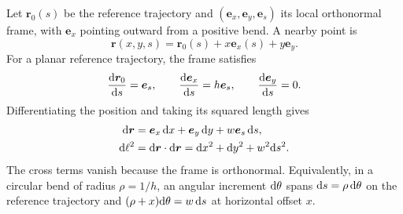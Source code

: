 Let \(\bm r_0(s)\) be the reference trajectory and
\((\bm e_x,\bm e_y,\bm e_s)\) its local orthonormal frame, with
\(\bm e_x\) pointing outward from a positive bend. A nearby point is
\begin{equation}
 \bm r(x,y,s)=\bm r_0(s)+x\bm e_x(s)+y\bm e_y.
\end{equation}
For a planar reference trajectory, the frame satisfies
\begin{equation}
 \frac{\text{d}\bm r_0}{\text{d} s}=\bm e_s,\qquad
 \frac{\text{d}\bm e_x}{\text{d} s}=h\bm e_s,\qquad
 \frac{\text{d}\bm e_y}{\text{d} s}=0.
\end{equation}
Differentiating the position and taking its squared length gives
\begin{align}
 \text{d}\bm r&=\bm e_x\,\text{d} x+\bm e_y\,\text{d} y+w\bm e_s\,\text{d} s,\\
 \text{d}\ell^2&=\text{d}\bm r\cdot\text{d}\bm r
             =\text{d} x^2+\text{d} y^2+w^2\text{d} s^2.
 \label{bfe:line-element}
\end{align}
The cross terms vanish because the frame is orthonormal. Equivalently,
in a circular bend of radius \(\rho=1/h\), an angular increment
\(\text{d}\theta\) spans \(\text{d} s=\rho\,\text{d}\theta\) on the reference
trajectory and \((\rho+x)\text{d}\theta=w\,\text{d} s\) at horizontal offset \(x\).

